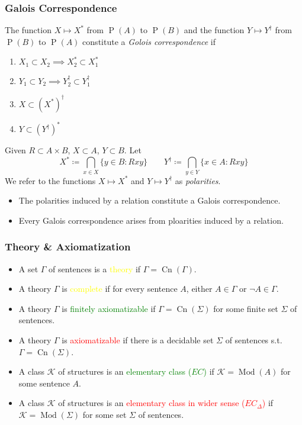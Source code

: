 \documentclass[UTF8,aspectratio=43,11pt,colorlinks,compress,openany]{beamer}%
\begin{document}
\begin{frame}\frametitle{Galois Correspondence}
\setlength\abovedisplayskip{0pt}
\setlength\belowdisplayskip{0pt}
\begin{definition}
The function $X\mapsto X^*$ from $\operatorname{P}(A)$ to $\operatorname{P}(B)$ and the function $Y\mapsto Y^\dagger$ from $\operatorname{P}(B)$ to $\operatorname{P}(A)$ constitute a \emph{Golois correspondence} if
\begin{enumerate}
	\item $X_1\subset X_2\implies X_2^*\subset X_1^*$
	\item $Y_1\subset Y_2\implies Y_2^\dagger\subset Y_1^\dagger$
	\item $X\subset(X^*)^\dagger$
	\item $Y\subset(Y^\dagger)^*$
\end{enumerate}
\end{definition}
\begin{definition}[Polarity]
Given $R\subset A\times B$, $X\subset A$, $Y\subset B$. Let
\[X^*\coloneqq \bigcap_{x\in X}\{y\in B: Rxy\}\qquad Y^\dagger\coloneqq \bigcap_{y\in Y}\{x\in A: Rxy\}\]
We refer to the functions $X\mapsto X^*$ and $Y\mapsto Y^\dagger$ as \emph{polarities}.
\end{definition}
\begin{itemize}\small
	\item The polarities induced by a relation constitute a Galois correspondence.
	\item Every Galois correspondence arises from ploarities induced by a relation.
\end{itemize}
\end{frame}

\begin{frame}\frametitle{Theory \& Axiomatization}
	\begin{itemize}
		\item A set $\Gamma$ of sentences is a \textcolor{yellow}{theory} if $\Gamma=\operatorname{Cn}(\Gamma)$.
		\item A theory $\Gamma$ is \textcolor{yellow}{complete} if for every sentence $A$, either $A\in\Gamma$ or $\neg A\in\Gamma$.
		\item A theory $\Gamma$ is \textcolor{green}{finitely axiomatizable} if $\Gamma=\operatorname{Cn}(\Sigma)$ for some finite set $\Sigma$ of sentences.
		\item A theory $\Gamma$ is \textcolor{red}{axiomatizable} if there is a decidable set $\Sigma$ of sentences s.t. $\Gamma=\operatorname{Cn}(\Sigma)$.
		\item A class $\mathcal{K}$ of structures is an \textcolor{green}{elementary class ($EC$)} if $\mathcal{K}=\operatorname{Mod}(A)$ for some sentence $A$.
		\item A class $\mathcal{K}$ of structures is an \textcolor{red}{elementary class in wider sense ($EC_\Delta$)} if $\mathcal{K}=\operatorname{Mod}(\Sigma)$ for some set $\Sigma$ of sentences.
	\end{itemize}
\end{frame}
\end{document}
